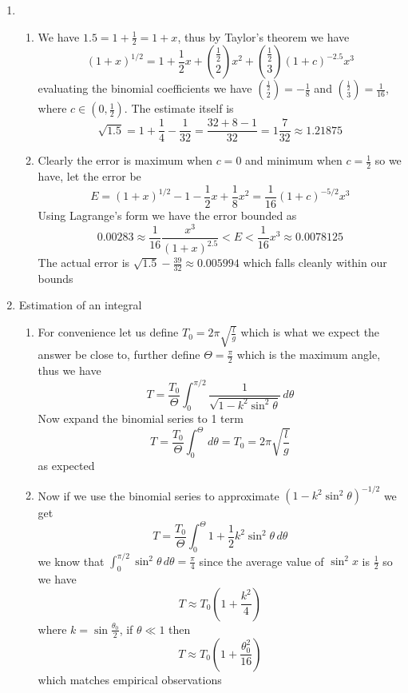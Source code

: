 \documentclass[12pt]{article}
\begin{document}
\begin{enumerate}
		\item
			\begin{enumerate}
				\item
					We have $1.5 = 1 + \frac{1}{2} = 1 + x$, thus by Taylor's theorem we have
					$$
					(1 + x)^{1/2} = 1 + \frac{1}{2}x + \binom{\frac{1}{2}}{2}x^{2} + \binom{\frac{1}{2}}{3} (1+c)^{-2.5}x^{3}
					$$
					evaluating the binomial coefficients we have $\binom{\frac{1}{2}}{2} = -\frac{1}{8}$ and $\binom{\frac{1}{2}}{3} = \frac{1}{16}$, where $c \in (0, \frac{1}{2} )$. The estimate itself is
					$$
					\sqrt{ 1.5 } = 1 + \frac{1}{4} - \frac{1}{32} = \frac{32 + 8-1}{32} = 1 \frac{7}{32} \approx 1.21875
					$$
				\item
					Clearly the error is maximum when $c=0$ and minimum when $c=\frac{1}{2}$ so we have, let the error be
					$$
					E = (1 + x)^{1/2} - 1 -\frac{1}{2}x + \frac{1}{8}x^{2} = \frac{1}{16}(1 + c)^{-5/2}x^{3}
					$$
					Using Lagrange's form we have the error bounded as
					$$
					0.00283 \approx \frac{1}{16} \frac{x^{3}}{(1 + x)^{2.5}} < E < \frac{1}{16}x^{3} \approx 0.0078125
					$$
					The actual error is $\sqrt{ 1.5 } - \frac{39}{32} \approx 0.005994$ which falls cleanly within our bounds
			\end{enumerate}

		\item
			Estimation of an integral
			\begin{enumerate}
				\item
					For convenience let us define $T_{0} = 2\pi \sqrt{ \frac{l}{g} }$ which is what we expect the answer be close to, further define $\Theta = \frac{\pi}{2}$ which is the maximum angle, thus we have
					$$
					T = \frac{T_{0}}{\Theta} \int_{0}^{\pi/2} \frac{1}{\sqrt{ 1-k^{2}\sin ^{2}\theta }} \, d\theta 
					$$
					Now expand the binomial series to 1 term
					$$
					T = \frac{T_{0}}{\Theta}\int_{0}^{\Theta}  \, d\theta = T_{0} = 2\pi \sqrt{ \frac{l}{g} }
					$$
					as expected
				\item
					Now if we use the binomial series to approximate $(1-k^{2}\sin ^{2}\theta)^{-1/2}$ we get
					$$
					T = \frac{T_{0}}{\Theta}\int_{0}^{\Theta} 1 + \frac{1}{2}k^{2}\sin ^{2}\theta \, d \theta  
					$$
					we know that $\int_{0}^{\pi/2} \sin ^{2}\theta \, d\theta = \frac{\pi}{4}$ since the average value of $\sin ^{2}x$ is $\frac{1}{2}$ so we have
					$$
					T \approx T_{0}\left( 1 + \frac{k^{2}}{4} \right)
					$$
					where $k = \sin \frac{\theta_{0}}{2}$, if $\theta \ll 1$ then 
					$$
					T \approx T_{0}\left( 1 + \frac{\theta_{0}^{2}}{16} \right)
					$$
					which matches empirical observations
			\end{enumerate}	
	\end{enumerate}
\end{document}
